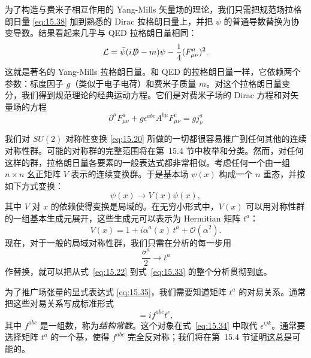 为了构造与费米子相互作用的 Yang-Mills 矢量场的理论，我们只需把规范场拉格朗日量 \eqref{eq:15.38} 加到熟悉的 Dirac 拉格朗日量上，并把 $\psi$ 的普通导数替换为协变导数。结果看起来几乎与 QED 拉格朗日量相同：
\begin{equation}
  \mathcal{L} = \bar{\psi}(i\slashed{D} - m)\psi - \frac{1}{4}(F^a_{\mu\nu})^2 .
  \label{eq:15.39}
\end{equation}
这就是著名的 Yang-Mills 拉格朗日量。和 QED 的拉格朗日量一样，它依赖两个参数：标度因子 $g$（类似于电子电荷）和费米子质量 $m$。对这个拉格朗日量变分，我们得到规范理论的经典运动方程。它们是对费米子场的 Dirac 方程和对矢量场的方程
\begin{equation}
  \partial^\mu F^a_{\mu\nu} + g\epsilon^{abc}A^{b\mu}F^c_{\mu\nu} = gj^a_\nu
  \label{eq:15.40}
\end{equation}

我们对 $SU(2)$ 对称性变换 \eqref{eq:15.20} 所做的一切都很容易推广到任何其他的连续对称性群。可能的对称群的完整范围将在第~15.4 节中枚举和分类。然而，对任何这样的群，拉格朗日量各要素的一般表达式都非常相似。考虑任何一个由一组 $n\times n$ 幺正矩阵 $V$ 表示的连续变换群。于是基本场 $\psi(x)$ 构成一个 $n$ 重态，并按如下方式变换：
\begin{equation}
  \psi(x) \to V(x)\psi(x) ,
  \label{eq:15.41}
\end{equation}
其中 $V$ 对 $x$ 的依赖使得变换是局域的。在无穷小形式中，$V(x)$ 可以用对称性群的一组基本生成元展开，这些生成元可以表示为 Hermitian 矩阵 $t^a$：
\begin{equation}
  V(x) = 1 + i\alpha^a(x)\,t^a + \mathcal{O}(\alpha^2) .
  \label{eq:15.42}
\end{equation}
现在，对于一般的局域对称性群，我们只需在分析的每一步用
\begin{equation}
  \frac{\sigma^a}{2} \to t^a
  \label{eq:15.43}
\end{equation}
作替换，就可以把从式~\eqref{eq:15.22} 到式~\eqref{eq:15.33} 的整个分析贯彻到底。

为了推广场张量的显式表达式 \eqref{eq:15.35}，我们需要知道矩阵 $t^a$ 的对易关系。通常把这些对易关系写成标准形式
\begin{equation}
  [t^a, t^b] = if^{abc}t^c ,
  \label{eq:15.44}
\end{equation}
其中 $f^{abc}$ 是一组数，称为\emph{结构常数}。这个对象在式~\eqref{eq:15.34} 中取代 $\epsilon^{ijk}$。通常要选择矩阵 $t^a$ 的一个基，使得 $f^{abc}$ 完全反对称；我们将在第~15.4 节证明这总是可能的。

